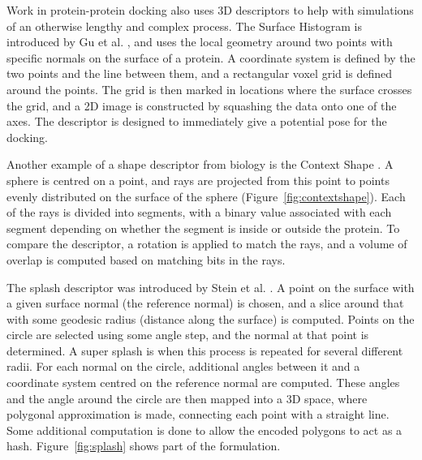 \documentclass[11pt,a4paper]{kth-mag}
\begin{document}
Work in protein-protein docking also uses 3D descriptors to help with
simulations of an otherwise lengthy and complex process. The Surface Histogram
is introduced by Gu et al. \cite{gu2012surface}, and uses the local geometry
around two points with specific normals on the surface of a protein. A
coordinate system is defined by the two points and the line between them, and a
rectangular voxel grid is defined around the points. The grid is then marked in
locations where the surface crosses the grid, and a 2D image is constructed by
squashing the data onto one of the axes. The descriptor is designed to
immediately give a potential pose for the docking.

Another example of a shape descriptor from biology is the Context Shape
\cite{shentu2008context}. A sphere is centred on a point, and rays are projected
from this point to points evenly distributed on the surface of the sphere (Figure~\ref{fig:contextshape}). Each
of the rays is divided into segments, with a binary value associated with each
segment depending on whether the segment is inside or outside the protein. To
compare the descriptor, a rotation is applied to match the rays, and a volume of
overlap is computed based on matching bits in the rays.

The splash descriptor was introduced by Stein et al. \cite{stein1992structural}.
A point on the surface with a given surface normal (the reference normal) is
chosen, and a slice around that with some geodesic radius (distance along the
surface) is computed. Points on the circle are selected using some angle step,
and the normal at that point is determined. A super splash is when this process
is repeated for several different radii. For each normal on the circle,
additional angles between it and a coordinate system centred on the reference
normal are computed. These angles and the angle around the circle are then
mapped into a 3D space, where polygonal approximation is made, connecting each
point with a straight line. Some additional computation is done to allow the
encoded polygons to act as a hash. Figure~\ref{fig:splash} shows part of the
formulation.
\end{document}
